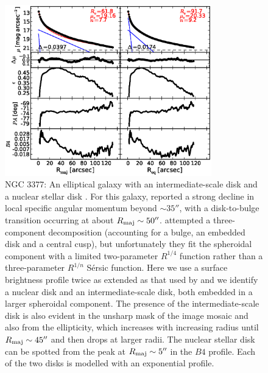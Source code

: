 \documentclass[preprint2]{emulateapj}
\newcommand{\fitfigurewidth}{0.8\textwidth}
\begin{document}
  \begin{figure}[h]
  \begin{center}
  \includegraphics[width=\fitfigurewidth]{n3377_1Dfit.eps}
  \caption{NGC 3377: 
  An elliptical galaxy with an intermediate-scale disk and a nuclear stellar disk \citep{ledo2010}. 
  For this galaxy, \citet{arnold2014} reported a strong decline in local specific angular momentum beyond $\sim 35''$, 
  with a disk-to-bulge transition occurring at about $R_{\rm maj} \sim 50''$.
  \citet{arnold2014} attempted a three-component decomposition (accounting for a bulge, an embedded disk and a central cusp), 
  but unfortunately they fit the spheroidal component with a limited two-parameter $R^{1/4}$ function 
  rather than a three-parameter $R^{1/n}$ S\'ersic function.
  Here we use a surface brightness profile twice as extended as that used by \citet{arnold2014} 
  and we identify a nuclear disk and an intermediate-scale disk, both embedded in a larger spheroidal component.
  The presence of the intermediate-scale disk is also evident in the unsharp mask of the image mosaic 
  and also from the ellipticity, which increases with increasing radius until $R_{\rm maj} \sim 45''$ 
  and then drops at larger radii.
  The nuclear stellar disk can be spotted from the peak at $R_{\rm maj} \sim 5''$ in the $B4$ profile.
  Each of the two disks is modelled with an exponential profile. 
  }
  \end{center}
  \end{figure}
  
\end{document}
